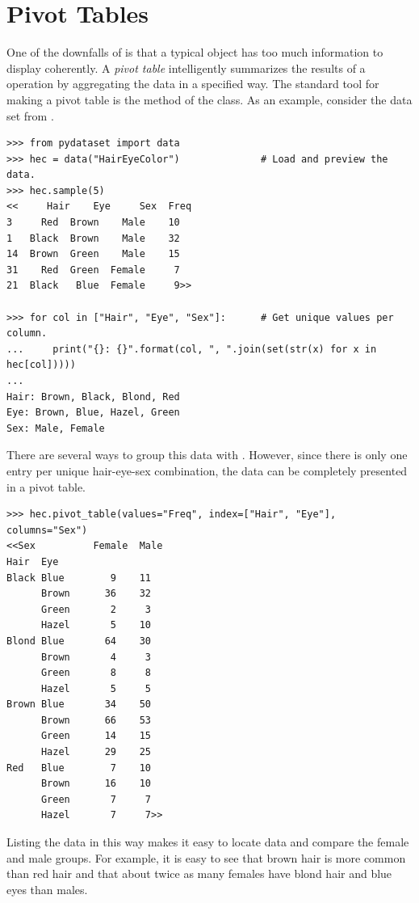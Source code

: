 \section*{Pivot Tables} %

One of the downfalls of  is that a typical  object has too much information to display coherently.
A \emph{pivot table} intelligently summarizes the results of a  operation by aggregating the data in a specified way.
The standard tool for making a pivot table is the  method of the  class.
As an example, consider the  data set from .

\begin{lstlisting}
>>> from pydataset import data
>>> hec = data("HairEyeColor")              # Load and preview the data.
>>> hec.sample(5)
<<     Hair    Eye     Sex  Freq
3     Red  Brown    Male    10
1   Black  Brown    Male    32
14  Brown  Green    Male    15
31    Red  Green  Female     7
21  Black   Blue  Female     9>>

>>> for col in ["Hair", "Eye", "Sex"]:      # Get unique values per column.
...     print("{}: {}".format(col, ", ".join(set(str(x) for x in hec[col]))))
...
Hair: Brown, Black, Blond, Red
Eye: Brown, Blue, Hazel, Green
Sex: Male, Female
\end{lstlisting}

There are several ways to group this data with .
However, since there is only one entry per unique hair-eye-sex combination, the data can be completely presented in a pivot table.

\begin{lstlisting}
>>> hec.pivot_table(values="Freq", index=["Hair", "Eye"], columns="Sex")
<<Sex          Female  Male
Hair  Eye
Black Blue        9    11
      Brown      36    32
      Green       2     3
      Hazel       5    10
Blond Blue       64    30
      Brown       4     3
      Green       8     8
      Hazel       5     5
Brown Blue       34    50
      Brown      66    53
      Green      14    15
      Hazel      29    25
Red   Blue        7    10
      Brown      16    10
      Green       7     7
      Hazel       7     7>>
\end{lstlisting}

Listing the data in this way makes it easy to locate data and compare the female and male groups.
For example, it is easy to see that brown hair is more common than red hair and that about twice as many females have blond hair and blue eyes than males.

